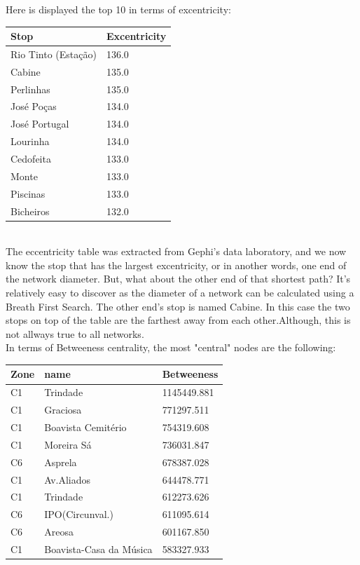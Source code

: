 \documentclass[12pt]{article}
\begin{document}
\begin{multicols}{2}
Here is displayed the top 10 in terms of excentricity:\\
\begin{tabular}[h]{|l|l|}
\hline
Stop & Excentricity\\
\hline
Rio Tinto (Estação) & 136.0	\\
Cabine & 135.0\\
Perlinhas & 135.0\\
José Poças & 134.0\\	
José Portugal & 134.0\\
Lourinha & 134.0\\
Cedofeita & 133.0\\
Monte & 133.0\\
Piscinas & 133.0\\	
Bicheiros & 132.0\\
\hline
\end{tabular}\\
The eccentricity table was extracted from Gephi's data laboratory, and we now know the stop that has the largest excentricity, or in another words, one end of the network diameter. But, what about the other end of that shortest path? It's relatively easy to discover as the diameter of a network can be calculated using a Breath First Search. The other end's stop is named Cabine. In this case the two stops on top of the table are the farthest away from each other.Although, this is not allways true to all networks.\\
In terms of Betweeness centrality, the most "central" nodes are the following:
\begin{center}
\begin{tabular}[h]{|l|l|l|}
\hline
Zone & name & Betweeness\\
\hline
C1   & Trindade	& 1145449.881\\
C1	 & Graciosa	& 771297.511\\
C1	 & Boavista Cemitério & 754319.608\\
C1	 & Moreira Sá & 736031.847\\
C6 	 & Asprela & 678387.028\\
C1	 & Av.Aliados & 644478.771\\
C1	 & Trindade & 612273.626\\
C6	 & IPO(Circunval.)	& 611095.614\\
C6	 & Areosa	& 601167.850\\
C1	 & Boavista-Casa da Música	& 583327.933\\
\hline
\end{tabular}
\end{center}


\end{multicols}
\end{document}
